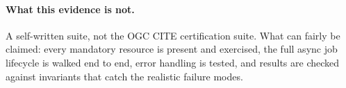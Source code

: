 \paragraph{What this evidence is not.} A self-written suite, not the OGC CITE
certification suite. What can fairly be claimed: every mandatory resource is
present and exercised, the full async job lifecycle is walked end to end, error
handling is tested, and results are checked against invariants that catch the
realistic failure modes.
